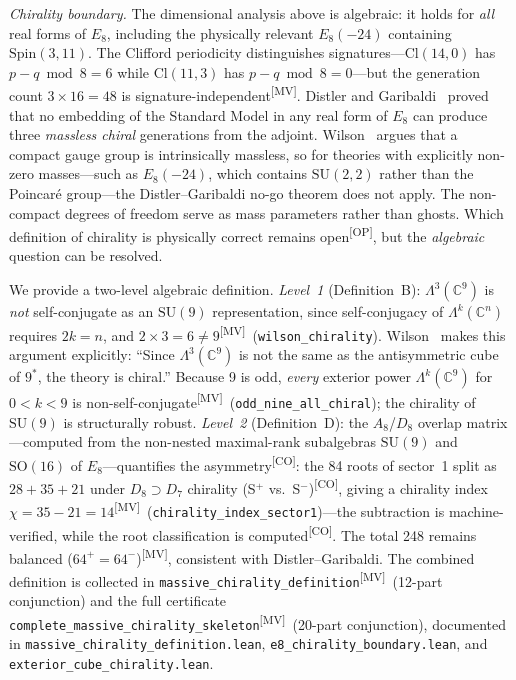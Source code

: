 \documentclass[aps,prl,twocolumn,showpacs,preprintnumbers,superscriptaddress,floatfix]{revtex4-2}
\newcommand{\Cl}{\mathrm{Cl}}
\newcommand{\MV}{\textsuperscript{[MV]}}
\newcommand{\CO}{\textsuperscript{[CO]}}
\newcommand{\OP}{\textsuperscript{[OP]}}
\begin{document}
\emph{Chirality boundary.}
The dimensional analysis above is algebraic: it holds for
\emph{all} real forms of $E_8$, including the physically relevant
$E_8(-24)$ containing $\mathrm{Spin}(3{,}11)$.  The Clifford periodicity
distinguishes signatures---$\Cl(14,0)$ has $p{-}q \bmod 8 = 6$ while
$\Cl(11,3)$ has $p{-}q \bmod 8 = 0$---but the generation count
$3 \times 16 = 48$ is signature-independent\MV.
Distler and Garibaldi~\cite{distler2010} proved that no embedding of
the Standard Model in any real form of $E_8$ can produce three
\emph{massless chiral} generations from the adjoint.
Wilson~\cite{wilson2024b} argues that a compact gauge group is
intrinsically massless, so for theories with explicitly non-zero
masses---such as $E_8(-24)$, which contains $\mathrm{SU}(2,2)$ rather
than the Poincar\'e group---the Distler--Garibaldi no-go theorem does
not apply. The non-compact degrees of freedom serve as mass parameters
rather than ghosts.
Which definition of chirality is physically correct remains open\OP,
but the \emph{algebraic} question can be resolved.

We provide a two-level algebraic definition.
\emph{Level~1} (Definition~B): $\Lambda^3(\mathbb{C}^9)$ is \emph{not}
self-conjugate as an $\mathrm{SU}(9)$ representation, since
self-conjugacy of $\Lambda^k(\mathbb{C}^n)$ requires $2k = n$, and
$2 \times 3 = 6 \neq 9$\MV\ (\texttt{wilson\_chirality}).
Wilson~\cite{wilson2024b} makes this argument explicitly: ``Since
$\Lambda^3(\mathbb{C}^9)$ is not the same as the antisymmetric cube of
$9^*$, the theory is chiral.''
Because 9 is odd, \emph{every} exterior power $\Lambda^k(\mathbb{C}^9)$
for $0 < k < 9$ is non-self-conjugate\MV\
(\texttt{odd\_nine\_all\_chiral}); the chirality of $\mathrm{SU}(9)$
is structurally robust.
\emph{Level~2} (Definition~D): the $A_8$/$D_8$ overlap
matrix---computed from the non-nested maximal-rank subalgebras
$\mathrm{SU}(9)$ and $\mathrm{SO}(16)$ of $E_8$---quantifies
the asymmetry\CO: the 84 roots of sector~1 split as $28 + 35 + 21$
under $D_8 \supset D_7$ chirality (S$^+$ vs.\ S$^-$)\CO, giving a
chirality index $\chi = 35 - 21 = 14$\MV\
(\texttt{chirality\_index\_sector1})---the subtraction is
machine-verified, while the root classification is computed\CO.
The total 248 remains balanced ($64^+ = 64^-$)\MV, consistent
with Distler--Garibaldi.
The combined definition is collected in
\texttt{massive\_chirality\_definition}\MV\ (12-part conjunction)
and the full certificate \texttt{complete\_massive\_chirality\_skeleton}\MV\
(20-part conjunction), documented in
\texttt{massive\_chirality\_definition.lean},
\texttt{e8\_chirality\_boundary.lean}, and
\texttt{exterior\_cube\_chirality.lean}.
\end{document}
